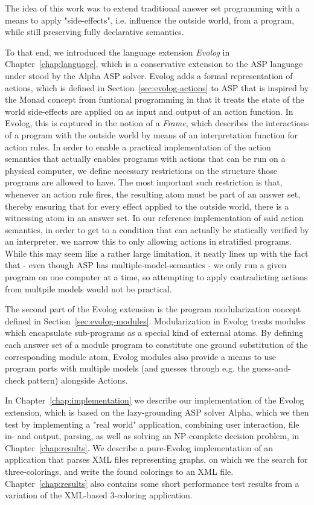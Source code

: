 The idea of this work was to extend traditional answer set programming with a means to apply "side-effects", i.e. influence the outside world, from a program, while still preserving fully declarative semantics. 

To that end, we introduced the language extension \emph{Evolog} in Chapter~\ref{chap:language}, which is a conservative extension to the ASP language under stood by the Alpha ASP solver. Evolog adds a formal representation of actions, which is defined in Section~\ref{sec:evolog-actions} to ASP that is inspired by the Monad concept from funtional programming in that it treats the state of the world side-effects are applied on as input and output of an action function. In Evolog, this is captured in the notion of a \emph{Frame}, which describes the interactions of a program with the outside world by means of an interpretation function for action rules. In order to enable a practical implementation of the action semantics that actually enables programs with actions that can be run on a physical computer, we define necessary restrictions on the structure those programs are allowed to have. The most important such restriction is that, whenever an action rule fires, the resulting atom must be part of an answer set, thereby ensuring that for every effect applied to the outside world, there is a witnessing atom in an answer set. In our reference implementation of said action semantics, in order to get to a condition that can actually be statically verified by an interpreter, we narrow this to only allowing actions in stratified programs. While this may seem like a rather large limitation, it neatly lines up with the fact that - even though ASP has multiple-model-semantics - we only run a given program on one computer at a time, so attempting to apply contradicting actions from multpile models would not be practical.

The second part of the Evolog extension is the program modularization concept defined in Section~\ref{sec:evolog-modules}. Modularization in Evolog treats modules which encapsulate sub-programs as a special kind of external atoms. By defining each answer set of a module program to constitute one ground substitution of the corresponding module atom, Evolog modules also provide a means to use program parts with multiple models (and guesses through e.g. the guess-and-check pattern) alongside Actions.

In Chapter~\ref{chap:implementation} we describe our implementation of the Evolog extension, which is based on the lazy-grounding ASP solver Alpha, which we then test by implementing a "real world" application, combining user interaction, file in- and output, parsing, as well as solving an NP-complete decision problem, in Chapter~\ref{chap:results}. We describe a pure-Evolog implementation of an application that parses XML files representing graphs, on which we the search for three-colorings, and write the found colorings to an XML file. Chapter~\ref{chap:results} also contains some short performance test results from a variation of the XML-based 3-coloring application.

